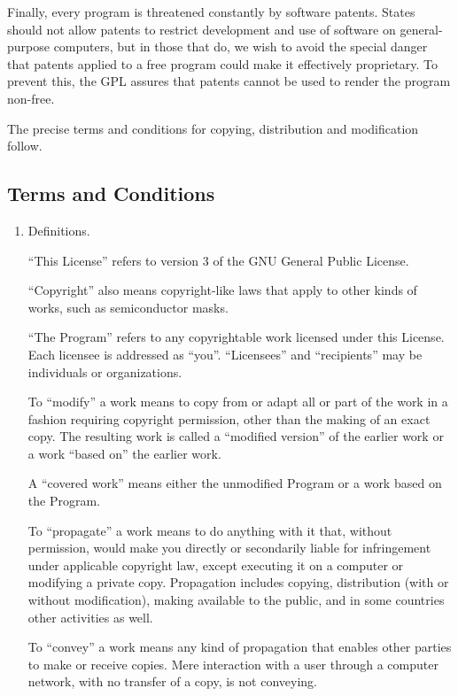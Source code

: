 \documentclass{article}
\begin{document}
Finally, every program is threatened constantly by software patents. States should not allow patents to restrict development and use of software on general-purpose computers, but in those that do, we wish to avoid the special danger that patents applied to a free program could make it effectively proprietary.  To prevent this, the GPL assures that patents cannot be used to render the program non-free.

The precise terms and conditions for copying, distribution and modification follow.

\subsection{Terms and Conditions}

\begin{enumerate}[\hspace{-18pt}1.]


\item Definitions.

``This License'' refers to version 3 of the GNU General Public License.

``Copyright'' also means copyright-like laws that apply to other kinds of works, such as semiconductor masks.

``The Program'' refers to any copyrightable work licensed under this License.  Each licensee is addressed as ``you''.  ``Licensees'' and ``recipients'' may be individuals or organizations.

To ``modify'' a work means to copy from or adapt all or part of the work in a fashion requiring copyright permission, other than the making of an exact copy.  The resulting work is called a ``modified version'' of the earlier work or a work ``based on'' the earlier work.

A ``covered work'' means either the unmodified Program or a work based on the Program.

To ``propagate'' a work means to do anything with it that, without permission, would make you directly or secondarily liable for infringement under applicable copyright law, except executing it on a computer or modifying a private copy.  Propagation includes copying, distribution (with or without modification), making available to the public, and in some countries other activities as well.

To ``convey'' a work means any kind of propagation that enables other parties to make or receive copies.  Mere interaction with a user through a computer network, with no transfer of a copy, is not conveying.


\end{enumerate}
\end{document}
